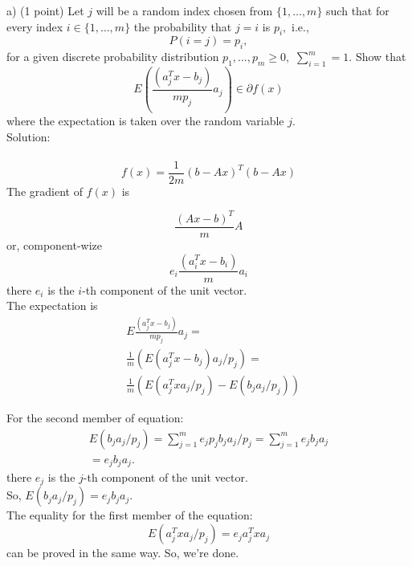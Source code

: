 \documentclass{article}
\begin{document}
a) (1 point) Let  $j$ will be a random index chosen from 
$\{1, \dots, m\}$ such that for every index 
$i \in \{1, \dots, m\}$ the probability that $j = i$
is $p_i,$ i.e., 
$$
P(i = j) = p_i,
$$
for a given discrete probability distribution
$p_1, \dots, p_m \geq 0, $
$\sum_{i=1}^{m} = 1.$ 
Show that 
$$
E(\frac{(a_j^T x - b_j)}{m p_j} a_j) \in \partial f(x)
$$
where the expectation is taken over the random variable $j.$ \\

Solution: \\ \\

$$
f(x) = \frac{1}{2 m} (b - Ax)^T (b - Ax)
$$
The gradient of $f(x)$ is

$$
\frac{(A x - b)^T}{m} A
$$
or, component-wize
$$
e_i\frac{(a_i^T x - b_i)}{m} a_i
$$
there $e_i $  is the $i$-th component of the unit vector. \\
The expectation is
\begin{align*}
&E\frac{(a_j^T x - b_j)}{m p_j} a_j = \\
&\frac{1}{m} (E(a_j^T x - b_j) a_j / p_j)  = \\
&\frac{1}{m} (E(a_j^T x a_j / p_j) - E(b_ja_j / p_j))
\end{align*}

For the second member of equation:
\begin{align*}
E(b_j a_j / p_j)  = 
\sum_{j=1}^m e_j p_j b_j a_j / p_j = 
\sum_{j=1}^m e_j b_j a_j \\=  e_j b_j a_j.
\end{align*}	
there $e_j $  is the $j$-th component of the unit vector. \\
So, $ E(b_j a_j/p_j) = e_j b_j a_j.$ \\
The equality for the first member of the equation:
$$
E(a_j^T x a_j/p_j) = e_j a_j^T x a_j
$$
can be proved in the same way.
So, we're done.
\end{document}
